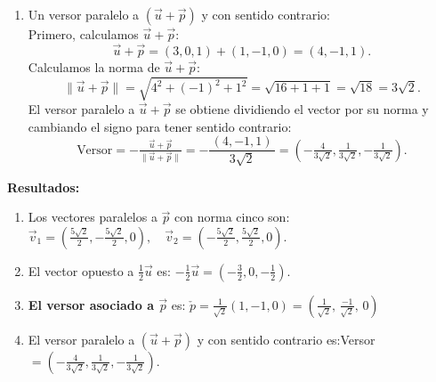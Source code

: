 \documentclass[11pt,a4paper]{article}
\begin{document}
\begin{enumerate}[\hspace{-5mm} 1) ]
\begin{enumerate}
    Entonces, el versor asociado a $\vec{p}$ es:

    \[
    \check{p} = \frac{1}{\sqrt{2}}(1, -1, 0) = \left( \tfrac{1}{\sqrt{2}}, \, \tfrac{-1}{\sqrt{2}}, \, 0 \right)
    \]


    \item Un versor paralelo a $(\vec{u} + \vec{p})$ y con sentido contrario: \\
    Primero, calculamos $\vec{u} + \vec{p}$:
    \[
    \vec{u} + \vec{p} = (3, 0, 1) + (1, -1, 0) = (4, -1, 1).
    \]
    Calculamos la norma de $\vec{u} + \vec{p}$:
    \[
    \|\vec{u} + \vec{p}\| = \sqrt{4^2 + (-1)^2 + 1^2} = \sqrt{16 + 1 + 1} = \sqrt{18} = 3\sqrt{2}.
    \]
    El versor paralelo a $\vec{u} + \vec{p}$ se obtiene dividiendo el vector por su norma y cambiando el signo para tener sentido contrario:
    \[
    \text{Versor} = -\tfrac{\vec{u} + \vec{p}}{\|\vec{u} + \vec{p}\|} = -\dfrac{ \,  (4, -1, 1)\, }{3\sqrt{2}} = \left(-\tfrac{4}{3\sqrt{2}}, \tfrac{1}{3\sqrt{2}}, -\tfrac{1}{3\sqrt{2}}\right).
    \]
\end{enumerate}

\textbf{Resultados:}
\begin{enumerate}
    \item Los vectores paralelos a $\vec{p}$ con norma cinco son:\quad $\vec{v}_1 = \left(\tfrac{5\sqrt{2}}{2}, -\tfrac{5\sqrt{2}}{2}, 0\right), \quad \vec{v}_2 = \left(-\tfrac{5\sqrt{2}}{2}, \tfrac{5\sqrt{2}}{2}, 0\right).$
    


    
    \item El vector opuesto a $\tfrac{1}{2}\vec{u}$ es: \qquad $ -\tfrac{1}{2}\vec{u} = \left(-\tfrac{3}{2}, 0, -\tfrac{1}{2}\right).
    $ 

    \item \textbf{El versor asociado a $\vec{p}$} es: \quad $
    \check{p} = \frac{1}{\sqrt{2}}(1, -1, 0) = \left( \tfrac{1}{\sqrt{2}}, \, \tfrac{-1}{\sqrt{2}}, \, 0 \right)
    $



    
    \item El versor paralelo a $(\vec{u} + \vec{p})$ y con sentido contrario es:\qquad  Versor$ = \left(-\tfrac{4}{3\sqrt{2}}, \tfrac{1}{3\sqrt{2}}, -\tfrac{1}{3\sqrt{2}}\right).$
     
\end{enumerate}
    
    
    









\end{enumerate}
\end{document}
